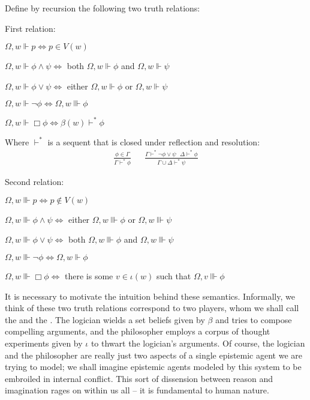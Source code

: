 \begin{definition}
  Define by recursion the following two truth relations:
  
  First relation:
  \begin{empt}
    \item $\Omega, w \Vdash p \Longleftrightarrow p \in V (w)$
    \item $\Omega, w \Vdash \phi \wedge \psi \Longleftrightarrow$ both $\Omega,
    w \Vdash \phi$ and $\Omega, w \Vdash \psi$
    \item $\Omega, w \Vdash \phi \vee \psi \Longleftrightarrow$ either $\Omega,
    w \Vdash \phi$ or $\Omega, w \Vdash \psi$
    \item $\Omega, w \Vdash \neg \phi \Longleftrightarrow \Omega, w \Vvdash
    \phi$
    \item $\Omega, w \Vdash \Box \phi \Longleftrightarrow \beta (w)
    \vdash^{\ast} \phi$
    
    Where $\vdash^{\ast}$ is a sequent that is closed under reflection
    and resolution:
    \begin{eqnarray*}
      \frac{\phi \in \Gamma}{\Gamma \vdash^{\ast} \phi} &  & \frac{\Gamma
      \vdash^{\ast} \neg \phi \vee \psi \ \ \  \Delta \vdash^{\ast}
      \phi}{\Gamma \cup \Delta \vdash^{\ast} \psi}
    \end{eqnarray*}
  \end{empt}
  Second relation:
  \begin{empt}
    \item $\Omega, w \Vvdash p \Longleftrightarrow p \nin V (w)$
    \item $\Omega, w \Vvdash \phi \wedge \psi \Longleftrightarrow$ either $\Omega, w \Vvdash \phi$ or $\Omega, w \Vvdash \psi$
    \item $\Omega, w \Vvdash \phi \vee \psi \Longleftrightarrow$ both $\Omega,
    w \Vvdash \phi$ and $\Omega, w \Vvdash \psi$
    \item $\Omega, w \Vvdash \neg \phi \Longleftrightarrow \Omega, w \Vdash
    \phi$
    \item $\Omega, w \Vvdash \Box \phi \Longleftrightarrow$ there is some $v
    \in \iota (w)$ such that $\Omega, v \Vvdash \phi$
  \end{empt}
\end{definition}

It is necessary to motivate the intuition behind these semantics.  
Informally, we think of these two truth relations correspond to two
players, whom we shall call the
{} and the {}.   The logician wields a set
beliefs given by $\beta$ and tries to compose compelling arguments, and the
philosopher employs a corpus of thought experiments given by $\iota$ to thwart
the logician's arguments.   Of course, the logician and the philosopher are
really just two aspects of a single epistemic agent we are trying to model; we
shall imagine epistemic agents modeled by this system to be embroiled in internal
conflict.  This sort of dissension between reason and imagination rages
on within us all -- it is fundamental to human nature.

